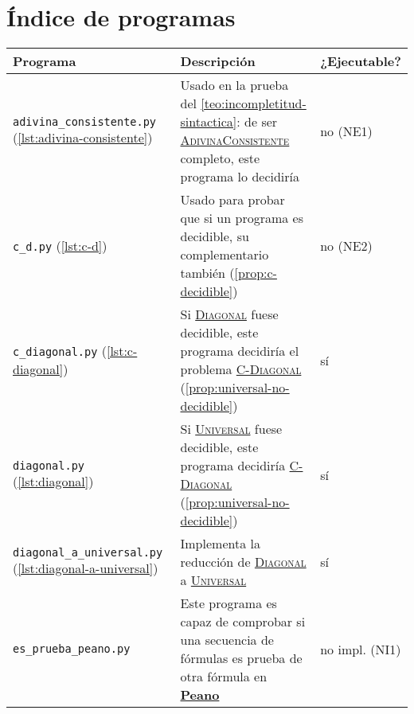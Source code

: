 \section{Índice de programas}

\begin{tabularx}{\textwidth}{L{0.3} L{0.5} L{0.2}}
\midrule
Programa & Descripción & ¿Ejecutable? \\
\midrule
\texttt{adivina\_consistente.py} \linebreak \small{(\cref{lst:adivina-consistente})} & Usado en la prueba del \cref{teo:incompletitud-sintactica}: de ser \hyperref[prob:adivina-consistente]{\textsc{AdivinaConsistente}} completo, este programa lo decidiría \vspace{4pt} & no (NE1) \\

\texttt{c\_d.py} \linebreak \small{(\cref{lst:c-d})} & Usado para probar que si un programa es decidible, su complementario también (\cref{prop:c-decidible}) \vspace{4pt} & no (NE2) \\

\texttt{c\_diagonal.py} \linebreak \small{(\cref{lst:c-diagonal})} & Si \hyperref[prob:diagonal]{\textsc{Diagonal}} fuese decidible, este programa decidiría el problema \hyperref[prob:c-diagonal]{\textsc{C-Diagonal}} (\cref{prop:universal-no-decidible}) \vspace{4pt} & sí \\

\texttt{diagonal.py} \linebreak \small{(\cref{lst:diagonal})} & Si \hyperref[prob:universal]{\textsc{Universal}} fuese decidible, este programa decidiría \hyperref[prob:c-diagonal]{\textsc{C-Diagonal}} (\cref{prop:universal-no-decidible}) \vspace{4pt} & sí \\

\texttt{diagonal\_a\_universal.py} \linebreak \small{(\cref{lst:diagonal-a-universal})} & Implementa la reducción de \hyperref[prob:diagonal]{\textsc{Diagonal}} a \hyperref[prob:universal]{\textsc{Universal}} \vspace{4pt} & sí \\

\texttt{es\_prueba\_peano.py} & Este programa es capaz de comprobar si una secuencia de fórmulas es prueba de otra fórmula en \hyperref[sl:peano]{\textbf{Peano}} \vspace{4pt} & no impl. (NI1) \\


\end{tabularx}
